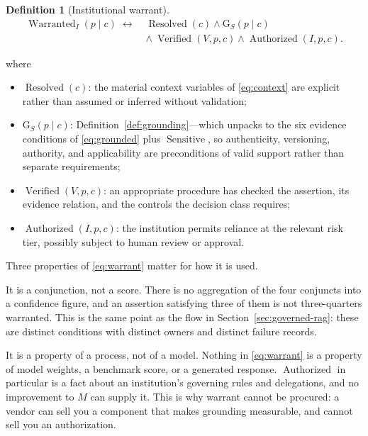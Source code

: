 \documentclass[11pt]{article}
\newcommand{\Grd}{\mathrm{G}}          %
\newcommand{\Resolved}{\operatorname{Resolved}}
\newcommand{\Sensitive}{\operatorname{Sensitive}}
\newcommand{\Warranted}{\operatorname{Warranted}}
\newcommand{\Verified}{\operatorname{Verified}}
\newcommand{\Authorized}{\operatorname{Authorized}}
\theoremstyle{plain}
\theoremstyle{definition}
\newtheorem{definition}{Definition}
\begin{document}
\begin{definition}[Institutional warrant]
\label{def:warrant}
\begin{equation}
  \begin{aligned}
  \Warranted_I(p \mid c) \;\leftrightarrow\;
    &\Resolved(c) \wedge \Grd_S(p \mid c)\\
    &\wedge\ \Verified(V, p, c) \wedge \Authorized(I, p, c).
  \end{aligned}
  \label{eq:warrant}
\end{equation}
\end{definition}

where

\begin{itemize}
  \item $\Resolved(c)$: the material context variables of \eqref{eq:context} are
        explicit rather than assumed or inferred without validation;
  \item $\Grd_S(p \mid c)$: Definition~\ref{def:grounding}---which unpacks to the
        six evidence conditions of \eqref{eq:grounded} plus $\Sensitive$, so
        authenticity, versioning, authority, and applicability are preconditions of
        valid support rather than separate requirements;
  \item $\Verified(V, p, c)$: an appropriate procedure has checked the assertion,
        its evidence relation, and the controls the decision class requires;
  \item $\Authorized(I, p, c)$: the institution permits reliance at the relevant
        risk tier, possibly subject to human review or approval.
\end{itemize}

Three properties of \eqref{eq:warrant} matter for how it is used.

It is a conjunction, not a score. There is no aggregation of the four conjuncts into
a confidence figure, and an assertion satisfying three of them is not
three-quarters warranted. This is the same point as the flow in
Section~\ref{sec:governed-rag}: these are distinct conditions with distinct owners
and distinct failure records.

It is a property of a process, not of a model. Nothing in \eqref{eq:warrant} is a
property of model weights, a benchmark score, or a generated response.
$\Authorized$ in particular is a fact about an institution's governing rules and
delegations, and no improvement to $M$ can supply it. This is why warrant cannot be
procured: a vendor can sell you a component that makes grounding measurable, and
cannot sell you an authorization.
\end{document}
